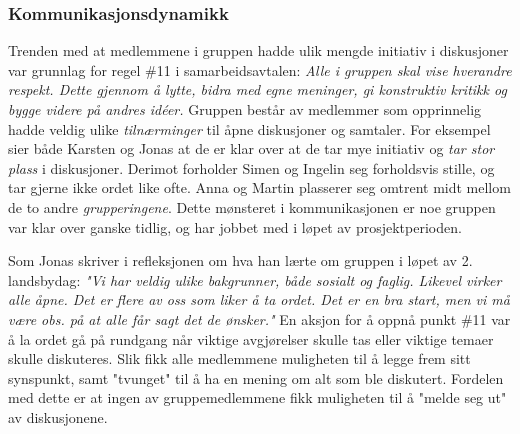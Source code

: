 \subsubsection{Kommunikasjonsdynamikk}

Trenden med at medlemmene i gruppen hadde ulik mengde initiativ i diskusjoner var grunnlag for regel \#11 i samarbeidsavtalen: \textit{Alle i gruppen skal vise hverandre respekt.
Dette gjennom å lytte, bidra med egne meninger, gi konstruktiv kritikk og bygge videre på andres id\'{e}er.} 
Gruppen består av medlemmer som opprinnelig hadde veldig ulike \textit{tilnærminger} til åpne diskusjoner og samtaler.
For eksempel sier både Karsten og Jonas at de er klar over at de tar mye initiativ og \textit{tar stor plass} i diskusjoner.
Derimot forholder Simen og Ingelin seg forholdsvis stille, og tar gjerne ikke ordet like ofte.
Anna og Martin plasserer seg omtrent midt mellom de to andre \textit{grupperingene}.
Dette mønsteret i kommunikasjonen er noe gruppen var klar over ganske tidlig, og har jobbet med i løpet av prosjektperioden.

Som Jonas skriver i refleksjonen om hva han lærte om gruppen i løpet av 2. landsbydag:
\textit{"Vi har veldig ulike bakgrunner, både sosialt og faglig. Likevel virker alle åpne. Det er flere av oss som liker å ta ordet. Det er en bra start, men vi må være obs. på at alle får sagt det de ønsker."}
En aksjon for å oppnå punkt \#11 var å la ordet gå på rundgang når viktige avgjørelser skulle tas eller viktige temaer skulle diskuteres.
Slik fikk alle medlemmene muligheten til å legge frem sitt synspunkt, samt "tvunget" til å ha en mening om alt som ble diskutert.
Fordelen med dette er at ingen av gruppemedlemmene fikk muligheten til å "melde seg ut" av diskusjonene. \\


